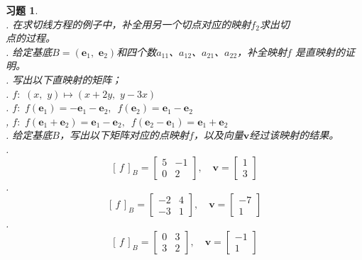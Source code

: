 \documentclass[12pt,UTF8]{ctexbook}
\newtheorem{xt}{习题}[section]
\begin{document}
\begin{xt}
    \mbox{} \\
    . 在求切线方程的例子中，补全用另一个切点对应的映射$f_2$求出切 \\
    \indent 点的过程。\\
    . 给定基底$B = (\mathbf{e}_1,\,\, \mathbf{e}_2)$和四个数$a_{11}$、$a_{12}$、$a_{21}$、$a_{22}$，补全映射$f$
    \indent 是直映射的证明。\\
    . 写出以下直映射的矩阵；\\
    . $f: \,\, (x,\,\, y) \mapsto (x + 2y,\,\, y - 3x)$ \\
    . $f: \,\, f(\mathbf{e}_1) = -\mathbf{e}_1 - \mathbf{e}_2,\,\,\, f(\mathbf{e}_2) = \mathbf{e}_1 - \mathbf{e}_2$ \\
    , $f: \,\, f(\mathbf{e}_1 + \mathbf{e}_2) = \mathbf{e}_1 - \mathbf{e}_2,\,\,\, f(\mathbf{e}_2 - \mathbf{e}_1) = \mathbf{e}_1 + \mathbf{e}_2$ \\
    . 给定基底$B$，写出以下矩阵对应的点映射$f$，以及向量$\mathbf{v}$经过该映射的结果。\\
    . $$
                [\,f\,]_B = 
                \begin{bmatrix}
                    5 & -1 \\ 0 & 2
                \end{bmatrix},\quad \mathbf{v} = \begin{bmatrix}
                    1\\ 3
                \end{bmatrix}
                $$
    . $$
                [\,f\,]_B = 
                \begin{bmatrix}
                    -2 & 4 \\ -3 & 1
                \end{bmatrix},\quad \mathbf{v} = \begin{bmatrix}
                    -7\\ 1
                \end{bmatrix}
                $$
    . $$
                [\,f\,]_B = 
                \begin{bmatrix}
                    0 & 3 \\ 3 & 2
                \end{bmatrix},\quad \mathbf{v} = \begin{bmatrix}
                    -1\\ 1
                \end{bmatrix}
                $$
\end{xt}
\end{document}
